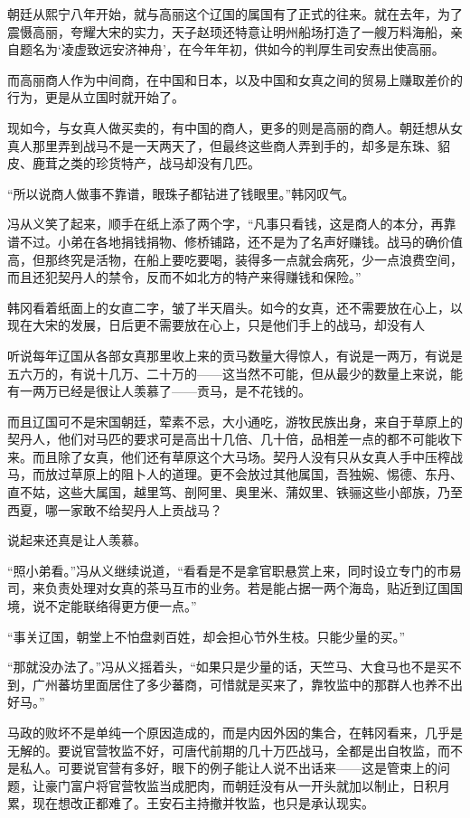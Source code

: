 朝廷从熙宁八年开始，就与高丽这个辽国的属国有了正式的往来。就在去年，为了震慑高丽，夸耀大宋的实力，天子赵顼还特意让明州船场打造了一艘万料海船，亲自题名为‘凌虚致远安济神舟’，在今年年初，供如今的判厚生司安焘出使高丽。

而高丽商人作为中间商，在中国和日本，以及中国和女真之间的贸易上赚取差价的行为，更是从立国时就开始了。

现如今，与女真人做买卖的，有中国的商人，更多的则是高丽的商人。朝廷想从女真人那里弄到战马不是一天两天了，但最终这些商人弄到手的，却多是东珠、貂皮、鹿茸之类的珍货特产，战马却没有几匹。

“所以说商人做事不靠谱，眼珠子都钻进了钱眼里。”韩冈叹气。

冯从义笑了起来，顺手在纸上添了两个字，“凡事只看钱，这是商人的本分，再靠谱不过。小弟在各地捐钱捐物、修桥铺路，还不是为了名声好赚钱。战马的确价值高，但那终究是活物，在船上要吃要喝，装得多一点就会病死，少一点浪费空间，而且还犯契丹人的禁令，反而不如北方的特产来得赚钱和保险。”

韩冈看着纸面上的女直二字，皱了半天眉头。如今的女真，还不需要放在心上，以现在大宋的发展，日后更不需要放在心上，只是他们手上的战马，却没有人

听说每年辽国从各部女真那里收上来的贡马数量大得惊人，有说是一两万，有说是五六万的，有说十几万、二十万的——这当然不可能，但从最少的数量上来说，能有一两万已经是很让人羡慕了——贡马，是不花钱的。

而且辽国可不是宋国朝廷，荤素不忌，大小通吃，游牧民族出身，来自于草原上的契丹人，他们对马匹的要求可是高出十几倍、几十倍，品相差一点的都不可能收下来。而且除了女真，他们还有草原这个大马场。契丹人没有只从女真人手中压榨战马，而放过草原上的阻卜人的道理。更不会放过其他属国，吾独婉、惕德、东丹、直不姑，这些大属国，越里笃、剖阿里、奥里米、蒲奴里、铁骊这些小部族，乃至西夏，哪一家敢不给契丹人上贡战马？

说起来还真是让人羡慕。

“照小弟看。”冯从义继续说道，“看看是不是拿官职悬赏上来，同时设立专门的市易司，来负责处理对女真的茶马互市的业务。若是能占据一两个海岛，贴近到辽国国境，说不定能联络得更方便一点。”

“事关辽国，朝堂上不怕盘剥百姓，却会担心节外生枝。只能少量的买。”

“那就没办法了。”冯从义摇着头，“如果只是少量的话，天竺马、大食马也不是买不到，广州蕃坊里面居住了多少蕃商，可惜就是买来了，靠牧监中的那群人也养不出好马。”

马政的败坏不是单纯一个原因造成的，而是内因外因的集合，在韩冈看来，几乎是无解的。要说官营牧监不好，可唐代前期的几十万匹战马，全都是出自牧监，而不是私人。可要说官营有多好，眼下的例子能让人说不出话来——这是管束上的问题，让豪门富户将官营牧监当成肥肉，而朝廷没有从一开头就加以制止，日积月累，现在想改正都难了。王安石主持撤并牧监，也只是承认现实。

